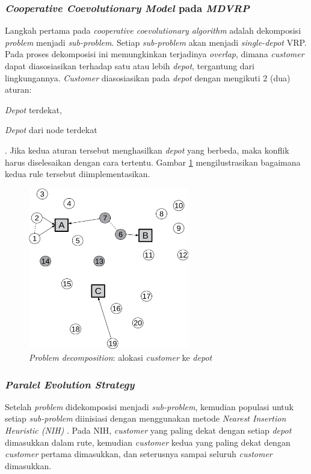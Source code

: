 \subsubsection{\textit{Cooperative Coevolutionary Model} pada \textit{MDVRP}}
Langkah pertama pada \textit{cooperative coevolutionary algorithm} adalah dekomposisi \textit{problem} menjadi \textit{sub-problem}. Setiap \textit{sub-problem} akan menjadi \textit{single-depot} VRP. Pada proses dekomposisi ini memungkinkan terjadinya \textit{overlap}, dimana \textit{customer} dapat diasosiasikan terhadap satu atau lebih \textit{depot}, tergantung dari lingkungannya. \textit{Customer} diasosiasikan pada \textit{depot} dengan mengikuti 2 (dua) aturan:
\begin{inparaenum}[1)]
\item \textit{Depot} terdekat,
\item \textit{Depot} dari node terdekat
\end{inparaenum}.
Jika kedua aturan tersebut menghasilkan \textit{depot} yang berbeda, maka konflik harus diselesaikan dengan cara tertentu. Gambar \ref{fig:coes_problem_decomposition} mengilustrasikan bagaimana kedua rule tersebut diimplementasikan.


\begin{figure}[h]
	\centering
	\includegraphics[width=7cm]{../../Resources/Images/coes_problem_decomposition}
	\caption{\textit{Problem decomposition}: alokasi \textit{customer} ke \textit{depot}}
	\label{fig:coes_problem_decomposition}
\end{figure}


\subsubsection{\textit{Paralel Evolution Strategy}}
Setelah \textit{problem} didekomposisi menjadi \textit{sub-problem}, kemudian populasi untuk setiap \textit{sub-problem} diinisiasi dengan menggunakan metode \textit{Nearest Insertion Heuristic (NIH)} \citep{raff_routing_1983}. Pada NIH, \textit{customer} yang paling dekat dengan setiap \textit{depot} dimasukkan dalam rute, kemudian \textit{customer} kedua yang paling dekat dengan \textit{customer} pertama dimasukkan, dan seterusnya sampai seluruh \textit{customer} dimasukkan.


